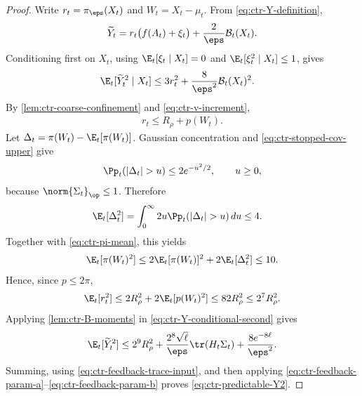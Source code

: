 \begin{proof}
    Write $r_t=\pi_\eps(X_t)$ and $W_t=X_t-\mu_t$.  From
    \eqref{eq:ctr-Y-definition},
    \begin{align}
        \widetilde Y_t
        =r_t\bigl(f(A_t)+\xi_t\bigr)
        +\frac2\eps\mathcal B_t(X_t).
        \label{eq:ctr-Y-decomposition}
    \end{align}
    Conditioning first on $X_t$, using
    $\E_t[\xi_t\mid X_t]=0$ and
    $\E_t[\xi_t^2\mid X_t]\leq1$, gives
    \begin{align}
        \E_t[\widetilde Y_t^2\mid X_t]
         & \leq3r_t^2+\frac8{\eps^2}\mathcal B_t(X_t)^2.
        \label{eq:ctr-Y-conditional-second}
    \end{align}
    By \cref{lem:ctr-coarse-confinement} and
    \eqref{eq:ctr-v-increment},
    \begin{align}
        r_t\leq R_\rho+p(W_t).
        \label{eq:ctr-r-envelope}
    \end{align}
    Let $\Delta_t=\pi(W_t)-\E_t[\pi(W_t)]$.  Gaussian concentration and
    \eqref{eq:ctr-stopped-cov-upper} give
    \begin{align}
        \Pp_t(|\Delta_t|>u)
        \leq2e^{-u^2/2},
        \qquad u\geq0,
    \end{align}
    because $\norm{\Sigma_t}_{\op}\leq1$.  Therefore
    \begin{align}
        \E_t[\Delta_t^2]
         & =\int_0^\infty2u\Pp_t(|\Delta_t|>u)\,du
        \leq4.
    \end{align}
    Together with \eqref{eq:ctr-pi-mean}, this yields
    \begin{align}
        \E_t[\pi(W_t)^2]
        \leq2\E_t[\pi(W_t)]^2+2\E_t[\Delta_t^2]
        \leq10.
    \end{align}
    Hence, since $p\leq2\pi$,
    \begin{align}
        \E_t[r_t^2]
        \leq2R_\rho^2+2\E_t[p(W_t)^2]
        \leq82R_\rho^2
        \leq2^7R_\rho^2.
        \label{eq:ctr-r-second}
    \end{align}
    Applying \cref{lem:ctr-B-moments} in
    \eqref{eq:ctr-Y-conditional-second} gives
    \begin{align}
        \E_t[\widetilde Y_t^2]
        \leq
        2^9R_\rho^2
        +\frac{2^8\sqrt\ell}{\eps}\tr(H_t\Sigma_t)
        +\frac{8e^{-8\ell}}{\eps^2}.
        \label{eq:ctr-Y-roundwise-second}
    \end{align}
    Summing, using \eqref{eq:ctr-feedback-trace-input}, and then applying
    \eqref{eq:ctr-feedback-param-a}--\eqref{eq:ctr-feedback-param-b} proves
    \eqref{eq:ctr-predictable-Y2}.


\end{proof}
